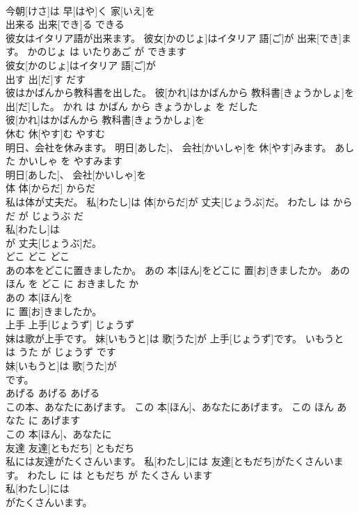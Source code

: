 \documentclass[8pt]{extreport}
\begin{document}
\begin{CJK}{UTF8}{min}
\\	今朝[けさ]は 早[はや]く 家[いえ]を
\\	出来る	出来[でき]る	できる	
\\	彼女はイタリア語が出来ます。	彼女[かのじょ]はイタリア 語[ご]が 出来[でき]ます。	かのじょ は いたりあご が できます	
\\	彼女[かのじょ]はイタリア 語[ご]が
\\	出す	出[だ]す	だす	
\\	彼はかばんから教科書を出した。	彼[かれ]はかばんから 教科書[きょうかしょ]を 出[だ]した。	かれ は かばん から きょうかしょ を だした	
\\	彼[かれ]はかばんから 教科書[きょうかしょ]を
\\	休む	休[やす]む	やすむ	
\\	明日、会社を休みます。	明日[あした]、 会社[かいしゃ]を 休[やす]みます。	あした かいしゃ を やすみます	
\\	明日[あした]、 会社[かいしゃ]を
\\	体	体[からだ]	からだ	
\\	私は体が丈夫だ。	私[わたし]は 体[からだ]が 丈夫[じょうぶ]だ。	わたし は からだ が じょうぶ だ	
\\	私[わたし]は
\\	が 丈夫[じょうぶ]だ。			
\\	どこ	どこ	どこ	
\\	あの本をどこに置きましたか。	あの 本[ほん]をどこに 置[お]きましたか。	あの ほん を どこ に おきました か	
\\	あの 本[ほん]を
\\	に 置[お]きましたか。			
\\	上手	上手[じょうず]	じょうず	
\\	妹は歌が上手です。	妹[いもうと]は 歌[うた]が 上手[じょうず]です。	いもうと は うた が じょうず です	
\\	妹[いもうと]は 歌[うた]が
\\	です。			
\\	あげる	あげる	あげる	
\\	この本、あなたにあげます。	この 本[ほん]、あなたにあげます。	この ほん あなた に あげます	
\\	この 本[ほん]、あなたに
\\	友達	友達[ともだち]	ともだち	
\\	私には友達がたくさんいます。	私[わたし]には 友達[ともだち]がたくさんいます。	わたし に は ともだち が たくさん います	
\\	私[わたし]には
\\	がたくさんいます。			

\end{CJK}
\end{document}
